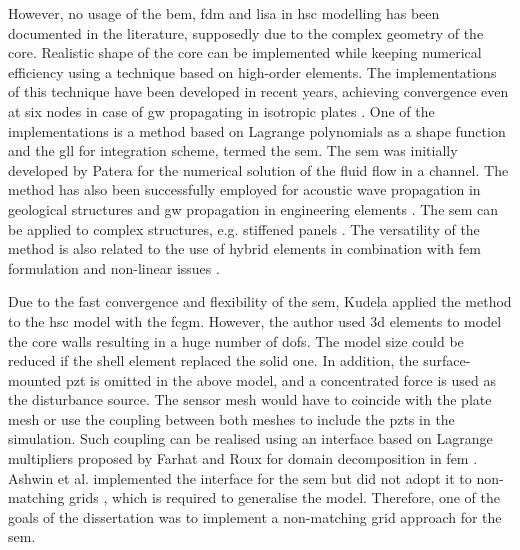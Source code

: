 \documentclass[a4paper,fleqn]{cas-dc}
\begin{document}
However, no usage of the \ac{bem}, \ac{fdm} and \ac{lisa} in \ac{hsc} modelling has been documented in the literature, supposedly due to the complex geometry of the core.
Realistic shape of the core can be implemented while keeping numerical efficiency using a technique based on high-order elements.
The implementations of this technique have been developed in recent years, achieving convergence even at six nodes in case of \ac{gw} propagating in isotropic plates \cite{willberg2012comparison}.
One of the implementations is a method based on Lagrange polynomials as a shape function and the \ac{gll} for integration scheme, termed the \ac{sem}.
The \ac{sem} was initially developed by Patera \cite{patera1984spectral} for the numerical solution of the fluid flow in a channel.
The method has also been successfully employed for acoustic wave propagation in geological structures \cite{seriani1994spectral, komatitsch2000simulation} and \ac{gw} propagation in engineering elements \cite{kudela2007wave, ostachowicz2011guided, rucka2010experimental,rekatsinas2017cubic}.
The \ac{sem} can be applied to complex structures, e.g. stiffened panels \cite{schulte2011simulation, lonkar2014modeling}.
The versatility of the method is also related to the use of hybrid elements in combination with \ac{fem} formulation \cite{ha2009optimizing} and non-linear issues \cite{yu2020time, li2021hybrid}.

Due to the fast convergence and flexibility of the \ac{sem}, Kudela \cite{kudela2016parallel} applied the method to the \ac{hsc} model with the \ac{fcgm}.
However, the author used \ac{3d} elements to model the core walls resulting in a huge number of \acp{dof}.
The model size could be reduced if the shell element replaced the solid one.
In addition, the surface-mounted \ac{pzt} is omitted in the above model, and a concentrated force is used as the disturbance source.
The sensor mesh would have to coincide with the plate mesh or use the coupling between both meshes to include the \acp{pzt} in the simulation.
Such coupling can be realised using an interface based on Lagrange multipliers proposed by Farhat and Roux for domain decomposition in \ac{fem} \cite{farhat1991method}.
Ashwin et al. implemented the interface for the \ac{sem} but did not adopt it to non-matching grids \cite{ashwin2014formulation}, which is required to generalise the model.
Therefore, one of the goals of the dissertation was to implement a non-matching grid approach for the \ac{sem}.
\end{document}
